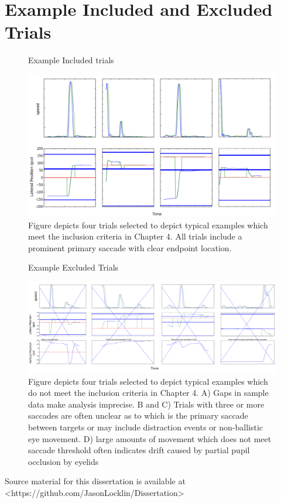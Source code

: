 \appendix
\chapter{Example Included and Excluded Trials}
\label{app}

\begin{figure}[p]
\centering
\begin{sffamily}
\large Example Included trials

\bigskip

\includegraphics[width=\textwidth]{appendix/accepted}
\end{sffamily}
\caption{Figure depicts four trials selected to depict typical
examples which meet the inclusion criteria in Chapter 4. All trials
include a prominent primary saccade with clear endpoint location.}
\end{figure}

\begin{figure}[p]
\centering
\begin{sffamily}
\large Example Excluded Trials

\bigskip

\includegraphics[width=\textwidth]{appendix/rejected}
\end{sffamily}
\caption{Figure depicts four trials selected to depict typical
examples which do not meet the inclusion criteria in Chapter 4. A) Gaps
in sample data make analysis imprecise. B and C) Trials with three or more saccades
are often unclear as to which is the primary saccade between targets or may include
distraction events or non-ballistic eye movement. 
D) large amounts of movement which does not meet saccade 
threshold often indicates drift caused by partial pupil occlusion by eyelids}
\end{figure}


Source material for this dissertation is available at <https://github.com/JasonLocklin/Dissertation>
